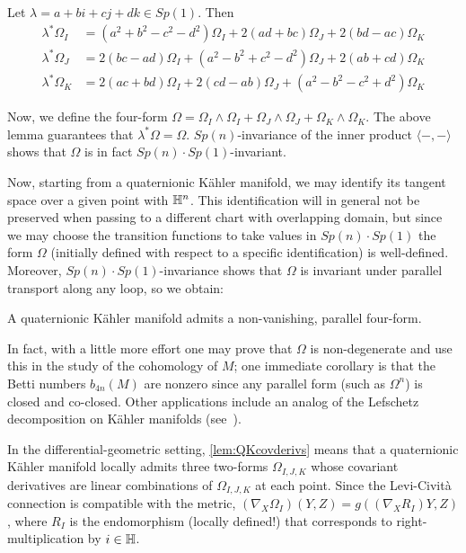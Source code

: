 \begin{lem}\label{lem:QKcovderivs}
	Let $\lambda=a+bi+cj+dk\in Sp(1)$. Then
	\begin{align*}
		\lambda^*\Omega_I&=(a^2+b^2-c^2-d^2)\Omega_I+2(ad+bc)\Omega_J
		+2(bd-ac)\Omega_K\\
		\lambda^*\Omega_J&=2(bc-ad)\Omega_I+(a^2-b^2+c^2-d^2)\Omega_J
		+2(ab+cd)\Omega_K\\
		\lambda^*\Omega_K&=2(ac+bd)\Omega_I+2(cd-ab)\Omega_J
		+(a^2-b^2-c^2+d^2)\Omega_K
	\end{align*}
\end{lem}

Now, we define the four-form $\Omega=\Omega_I\wedge \Omega_I+\Omega_J\wedge\Omega_J+\Omega_K\wedge\Omega_K$. The above lemma guarantees that $\lambda^*\Omega=\Omega$. $Sp(n)$-invariance of the inner product $\langle-,-\rangle$ shows that $\Omega$ is in fact $Sp(n)\cdot Sp(1)$-invariant. 

Now, starting from a quaternionic K\"ahler manifold, we may identify its tangent space over a given point with $\mathbb{H}^n$. This identification will in general not be preserved when passing to a different chart with overlapping domain, but since we may choose the transition functions to take values in $Sp(n)\cdot Sp(1)$ the form $\Omega$ (initially defined with respect to a specific identification) is well-defined. Moreover, $Sp(n)\cdot Sp(1)$-invariance shows that $\Omega$ is invariant under parallel transport along any loop, so we obtain:

\begin{prop}
	A quaternionic K\"ahler manifold admits a non-vanishing, parallel four-form. \proofclear
\end{prop}

In fact, with a little more effort one may prove that $\Omega$ is non-degenerate and use this in the study of the cohomology of $M$; one immediate corollary is that the Betti numbers $b_{4n}(M)$ are nonzero since any parallel form (such as $\Omega^n$) is closed and co-closed. Other applications include an analog of the Lefschetz decomposition on K\"ahler manifolds (see~\cite{Kra1966}). 

In the differential-geometric setting, \cref{lem:QKcovderivs} means that a quaternionic K\"ahler manifold locally admits three two-forms $\Omega_{I,J,K}$ whose covariant derivatives are linear combinations of $\Omega_{I,J,K}$ at each point. Since the Levi-Civit\`a connection is compatible with the metric, $(\nabla_X\Omega_I)(Y,Z)=g((\nabla_X R_I)Y,Z)$, where $R_I$ is the endomorphism (locally defined!) that corresponds to right-multiplication by $i\in \mathbb{H}$. 

